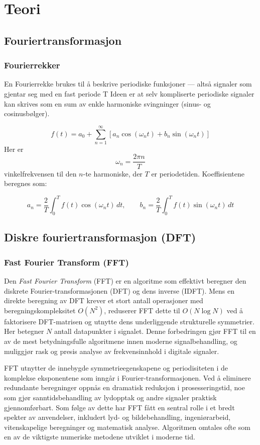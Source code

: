 \section{Teori}

\subsection{Fouriertransformasjon}

\subsubsection{Fourierrekker}
En Fourierrekke brukes til å beskrive periodiske funksjoner
— altså signaler som gjentar seg med en fast periode T
Ideen er at selv kompliserte periodiske signaler kan skrives 
som en sum av enkle harmoniske svingninger 
(sinus- og cosinusbølger). 

\[
f(t) = a_0 + \sum_{n=1}^{\infty} \left[ a_n \cos(\omega_n t) + b_n \sin(\omega_n t) \right]
\]
Her er 
\[
\omega_n = \frac{2\pi n}{T}
\]
vinkelfrekvensen til den $n$-te harmoniske, der $T$ er periodetiden. 
Koeffisientene beregnes som:

\[
a_n = \frac{2}{T} \int_{0}^{T} f(t)\cos(\omega_n t)\,dt, \qquad
b_n = \frac{2}{T} \int_{0}^{T} f(t)\sin(\omega_n t)\,dt
\]



\subsection{Diskre fouriertransformasjon (DFT)}

\subsubsection{Fast Fourier Transform (FFT)}
Den \textit{Fast Fourier Transform} (FFT) er en algoritme som effektivt beregner den diskrete Fourier-transformasjonen (DFT) og dens inverse (IDFT). 
Mens en direkte beregning av DFT krever et stort antall operasjoner med beregningskompleksitet $O(N^2)$, reduserer FFT dette til $O(N \log N)$ ved å faktorisere DFT-matrisen og utnytte dens underliggende strukturelle symmetrier. 
Her betegner $N$ antall datapunkter i signalet. 
Denne forbedringen gjør FFT til en av de mest betydningsfulle algoritmene innen moderne signalbehandling, og muliggjør rask og presis analyse av frekvensinnhold i digitale signaler.

FFT utnytter de innebygde symmetrieegenskapene og periodisiteten i de komplekse eksponentene som inngår i Fourier-transformasjonen. 
Ved å eliminere redundante beregninger oppnås en dramatisk reduksjon i prosesseringstid, noe som gjør sanntidsbehandling av lydopptak og andre signaler praktisk gjennomførbart. 
Som følge av dette har FFT fått en sentral rolle i et bredt spekter av anvendelser, inkludert lyd- og bildebehandling, ingeniørarbeid, vitenskapelige beregninger og matematisk analyse. 
Algoritmen omtales ofte som en av de viktigste numeriske metodene utviklet i moderne tid.

